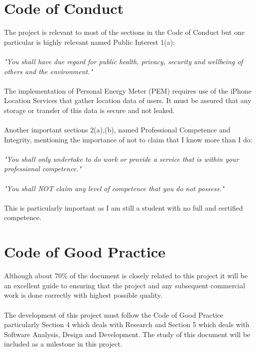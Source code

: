 \documentclass[12pt, a4paper]{report}   %
\begin{document}
\section{Code of Conduct}
The project is relevant to most of the sections in the Code of Conduct but one particular is highly relevant named Public Interest 1(a):\\ \\
\textit{"You shall have due regard for public health, privacy, security and wellbeing of others and the environment."}\\ \\
The implementation of Personal Energy Meter (PEM) requires use of the iPhone Location Services that gather location data of users. It must be assured that any storage or transfer of this data is secure and not leaked.\\ \\
Another important sections 2(a),(b), named Professional Competence and Integrity, mentioning the importance of not to claim that I know more than I do:\\ \\
\textit{"You shall only undertake to do work or provide a service that is within your professional competence."}\\ \\
\textit{"You shall NOT claim any level of competence that you do not possess."}\\ \\
This is particularly important as I am still a student with no full and certified competence.

\section{Code of Good Practice}
Although about 70\% of the document is closely related to this project it will be an excellent guide to ensuring that the project and any subsequent commercial work  is done correctly with highest possible quality.\\ \\
The development of this project must follow the Code of Good Practice particularly Section 4 which deals with Research and Section 5 which deals with Software Analysis, Design and Development. The study of this document will be included as a milestone in this project.


\end{document}
